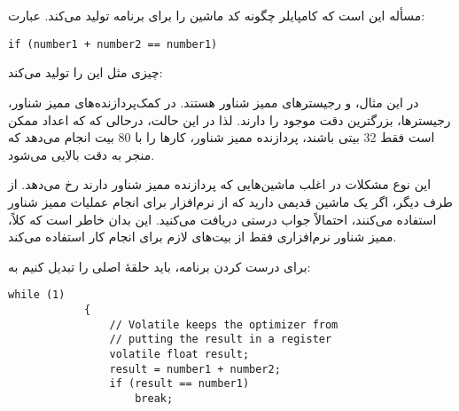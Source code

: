 \section{}
\paragraph{}\label{answer:73}
مسأله این است که کامپایلر چگونه کد ماشین را برای برنامه تولید می‌کند. عبارت:
\begin{LTR}
        \begin{lstlisting}[style=C++Style]
            if (number1 + number2 == number1)
        \end{lstlisting}
\end{LTR}

چیزی مثل این را تولید می‌کند:
\begin{LTR}\noindent
\end{LTR}

در این مثال،  و  رجیسترهای ممیز شناور هستند. در کمک‌پردازنده‌های ممیز شناور، رجیسترها، بزرگترین دقت موجود را دارند. لذا در این حالت، درحالی که که اعداد ممکن است فقط 32 بیتی باشند، پردازنده ممیز شناور، کارها را با 80 بیت انجام می‌دهد که منجر به دقت بالایی می‌شود.

این نوع مشکلات در اغلب ماشین‌هایی که پردازنده ممیز شناور دارند رخ می‌دهد. از طرف دیگر، اگر یک ماشین قدیمی دارید که از نرم‌افزار برای انجام عملیات ممیز شناور استفاده می‌کنند، احتمالاً جواب درستی دریافت می‌کنید. این بدان خاطر است که کلاً، ممیز شناور نرم‌افزاری فقط از بیت‌های لازم برای انجام کار استفاده می‌کند.

برای درست کردن برنامه، باید حلقهٔ اصلی را تبدیل کنیم به:
\begin{LTR}
        \begin{lstlisting}[style=C++Style]
            while (1)
            {
                // Volatile keeps the optimizer from
                // putting the result in a register
                volatile float result;
                result = number1 + number2;
                if (result == number1)
                    break;
        \end{lstlisting}
\end{LTR}
